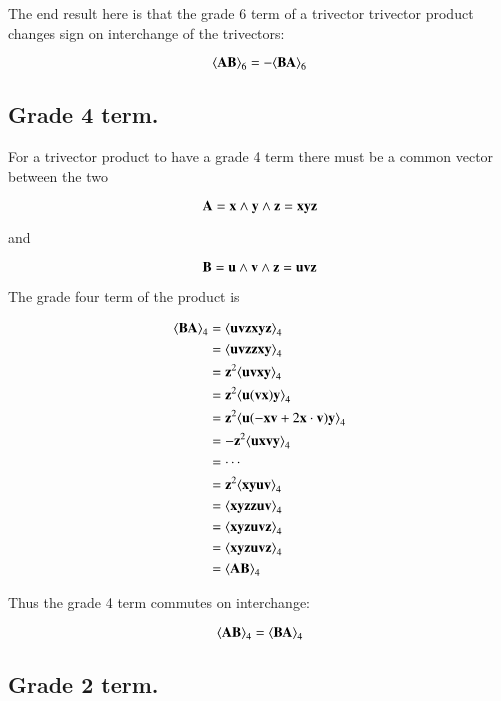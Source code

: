 \documentclass{article}      %
\newcommand{\gpgrade}[2] {{\left\langle{{#1}}\right\rangle}_{#2}}
\begin{document}
The end result here is that the grade 6 term of a trivector trivector product
changes sign on interchange of the trivectors:

\begin{equation}\label{eqn:trivecgpgrade6}
\gpgrade{\BA\BB}{6} = -\gpgrade{\BB\BA}{6}
\end{equation}

\subsection{ Grade 4 term. }

For a trivector product to have a grade 4 term there must be a common
vector between the two

\[
\mathbf{A} = \mathbf{x} \wedge \mathbf{y} \wedge \mathbf{z} = \mathbf{x}\mathbf{y}\mathbf{z}
\]

and

\[
\mathbf{B} = \mathbf{u} \wedge \mathbf{v} \wedge \mathbf{z} =\mathbf{u}\mathbf{v}\mathbf{z}
\]

The grade four term of the product is

\begin{align*}
\gpgrade{\BB \BA}{4}
&= \gpgrade{ \Bu\Bv\Bz \Bx\By\Bz }{4} \\
&= \gpgrade{ \Bu\Bv\Bz \Bz\Bx\By }{4} \\
&= \Bz^2\gpgrade{ \Bu\Bv\Bx\By }{4} \\
&= \Bz^2\gpgrade{ \Bu(\Bv\Bx)\By }{4} \\
&= \Bz^2\gpgrade{ \Bu(-\Bx\Bv + 2 \Bx \cdot \Bv)\By }{4} \\
&= -\Bz^2\gpgrade{ \Bu\Bx\Bv\By }{4} \\
&= \cdots \\
&= \Bz^2\gpgrade{ \Bx\By\Bu\Bv }{4} \\
&= \gpgrade{ \Bx\By\Bz\Bz\Bu\Bv }{4} \\
&= \gpgrade{ \Bx\By\Bz\Bu\Bv\Bz }{4} \\
&= \gpgrade{ \Bx\By\Bz\Bu\Bv\Bz }{4} \\
&= \gpgrade{\BA \BB}{4}
\end{align*}

Thus the grade 4 term commutes on interchange:

\begin{equation}\label{eqn:trivecgpgrade4}
\gpgrade{\BA\BB}{4} = \gpgrade{\BB\BA}{4}
\end{equation}

\subsection{ Grade 2 term. }
\end{document}
